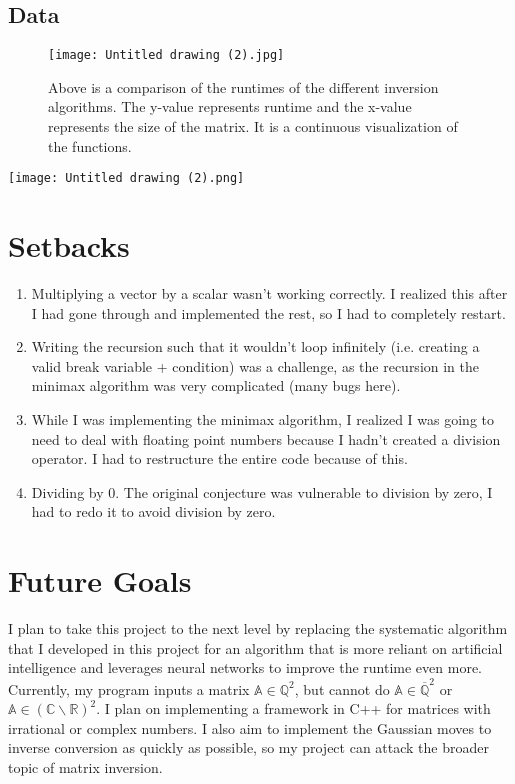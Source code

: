 \documentclass{article}
\begin{document}
\subsection*{Data}
\begin{figure}[h!]
\centering
\texttt{[image: Untitled drawing (2).jpg]}
\caption{Above is a comparison of the runtimes of the different inversion algorithms. The y-value represents runtime and the x-value represents the size of the matrix. It is a continuous visualization of the functions.}
\end{figure}
\begin{center}\texttt{[image: Untitled drawing (2).png]}\end{center}

\section*{Setbacks}
\begin{enumerate}
\item Multiplying a vector by a scalar wasn’t working correctly. I realized       this after I had gone through and implemented the rest, so I had to         completely restart.
\item Writing the recursion such that it wouldn’t loop infinitely (i.e.           creating a valid break variable + condition) was a challenge, as the        recursion in the minimax algorithm was very complicated (many bugs          here).
\item While I was implementing the minimax algorithm, I realized I was going       to need to deal with floating point numbers because I hadn’t created a       division operator. I had to restructure the entire code because of          this.
\item Dividing by 0. The original conjecture was vulnerable to division by        zero, I had to redo it to avoid division by zero.
\end{enumerate}

\section*{Future Goals}
I plan to take this project to the next level by replacing the systematic algorithm that I developed in this project for an algorithm that is more reliant on artificial intelligence and leverages neural networks to improve the runtime even more. Currently, my program inputs a matrix $\mathbb{A}\in \mathbb{Q}^2$, but cannot do $\mathbb{A}\in \overline{\mathbb{Q}}^2$ or $\mathbb{A}\in (\mathbb{C}\backslash \mathbb{R})^2$. I plan on implementing a framework in C++ for matrices with irrational or complex numbers.  I also aim to implement the Gaussian moves to inverse conversion as quickly as possible, so my project can attack the broader topic of matrix inversion.
\newpage
\end{document}
